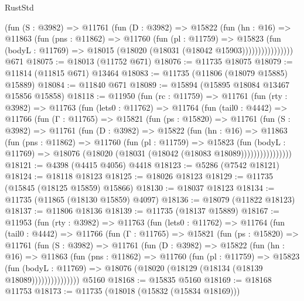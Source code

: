 \begin{lexlean}{RustStd}
\begin{coremodule}
                  (fun (S : @3982) =>
                  @11761
                    (fun (D : @3982) =>
                    @15822
                      (fun (hn : @16) =>
                      @11863
                        (fun (pns : @11862) =>
                        @11760
                          (fun (pl : @11759) =>
                          @15823
                            (fun (bodyL : @11769) =>
                            @18015 (@18020 (@18031 (@18042 @15903))))))))))))))))
    @671
@18075 := @18013 (@11752 @671)
@18076 := @11735 @18075
@18079 := @11814 (@11815 @671) @13464
@18083 := @11735 (@11806 (@18079 @15885) @15889)
@18084 := @11840 @671
@18089 := @15894 (@15895 @18084 @13467 @15856 @15858)
@18118 := @11950
    (fun (rc : @11759) =>
    @11761
      (fun (rty : @3982) =>
      @11763
        (fun (lets0 : @11762) =>
        @11764
          (fun (tail0 : @4442) =>
          @11766
            (fun (Γ : @11765) =>
            @15821
              (fun (ps : @15820) =>
              @11761
                (fun (S : @3982) =>
                @11761
                  (fun (D : @3982) =>
                  @15822
                    (fun (hn : @16) =>
                    @11863
                      (fun (pns : @11862) =>
                      @11760
                        (fun (pl : @11759) =>
                        @15823
                          (fun (bodyL : @11769) =>
                          @18076 (@18020 (@18031 (@18042 (@18083 @18089))))))))))))))))
@18121 := @4398 (@4415 @4056) @4418
@18123 := @5286 (@7542 @18121)
@18124 := @18118 @18123
@18125 := @18026 @18123
@18129 := @11735 (@15845 (@18125 @15859) @15866)
@18130 := @18037 @18123
@18134 := @11735 (@11865 (@18130 @15859) @4097)
@18136 := @18079 (@11822 @18123)
@18137 := @11806 @18136
@18139 := @11735 (@18137 @15889)
@18167 := @11953
    (fun (rty : @3982) =>
    @11763
      (fun (lets0 : @11762) =>
      @11764
        (fun (tail0 : @4442) =>
        @11766
          (fun (Γ : @11765) =>
          @15821
            (fun (ps : @15820) =>
            @11761
              (fun (S : @3982) =>
              @11761
                (fun (D : @3982) =>
                @15822
                  (fun (hn : @16) =>
                  @11863
                    (fun (pns : @11862) =>
                    @11760
                      (fun (pl : @11759) =>
                      @15823
                        (fun (bodyL : @11769) =>
                        @18076 (@18020 (@18129 (@18134 (@18139 @18089)))))))))))))))
    @5160
@18168 := @15835 @5160
@18169 := @18168 @11753
@18173 := @11735 (@18018 (@15832 (@15834 @18169)))

\end{coremodule}
\end{lexlean}
